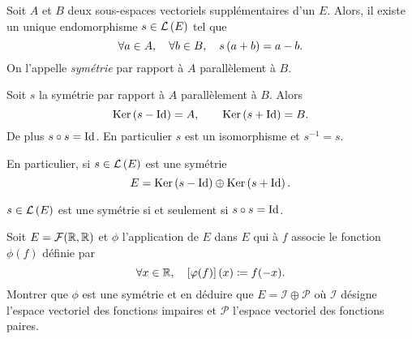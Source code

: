 \documentclass{magnoliaold}
\begin{document}
\begin{definition}[utile=-3]
Soit $A$ et $B$ deux sous-espaces vectoriels supplémentaires d'un \Kev $E$.
Alors, il existe un unique endomorphisme $s\in\mathcal{L}\left(E\right)$ tel que
\[\forall a\in A ,\quad \forall b\in B ,\quad s\left(a+b\right)=a-b.\]
On l'appelle \emph{symétrie} par rapport à $A$ parallèlement à $B$.
\end{definition}

\begin{proposition}[utile=1]
Soit $s$ la symétrie par rapport à $A$ parallèlement à $B$. Alors
\[\mathop{\rm Ker} \left(s-\operatorname{Id}\right)=A, \qquad \mathop{\rm Ker}\left(s+\operatorname{Id}\right)=B.\]
De plus $s\circ s=\operatorname{Id}$. En particulier $s$ est un isomorphisme et $s^{-1}=s$.
\end{proposition}

\begin{remarqueUnique}
\remarque[utile=1] En particulier, si $s\in\mathcal{L}\left(E\right)$ est une symétrie
  \[E=\mathop{\rm Ker}\left(s-\operatorname{Id}\right)\oplus\mathop{\rm Ker}\left(s+\operatorname{Id}\right).\]
\end{remarqueUnique}

\begin{proposition}[utile=3]
$s\in\mathcal{L}\left(E\right)$ est une symétrie si et seulement si $s\circ s=\operatorname{Id}$.  
\end{proposition}

\begin{exoUnique}
\exo Soit $E=\mathcal{F}(\mathbb{R},\mathbb{R})$ et $\phi$ l'application de $E$ dans $E$
  qui à $f$ associe le fonction $\phi(f)$ définie par
	\[\forall x\in\mathbb{R} ,\quad \left[\varphi(f)\right](x)\coloneqq f(-x).\]
	Montrer que $\phi$ est une symétrie et en déduire
  que $E=\mathcal{I}\oplus\mathcal{P}$ où $\mathcal{I}$ désigne l'espace
  vectoriel des fonctions impaires et $\mathcal{P}$ l'espace vectoriel
  des fonctions paires.
\end{exoUnique}



\end{document}
